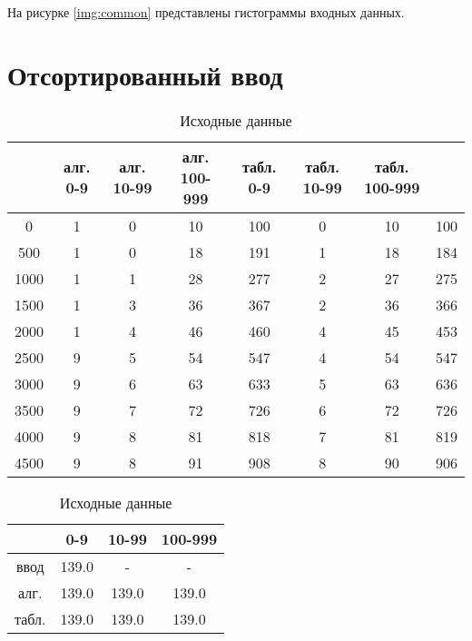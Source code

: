 На рисурке \ref{img:common} представлены гистограммы входных данных.


\section{Отсортированный ввод}

\begin{table}[ht]
	\begin{center}
		\caption{Исходные данные}
		\small
		\label{tbl:data2}
        \begin{tabular}{|c|c|c|c|c|c|c|c|}
        \hline
        {} &  алг. 0-9 &  алг. 10-99 &  алг. 100-999 &  табл. 0-9 &  табл. 10-99 &  табл. 100-999 \\
        \hline
        0    & 1 & 0 & 10 & 100 & 0 & 10 & 100 \\
        500  & 1 & 0 & 18 & 191 & 1 & 18 & 184 \\
        1000 & 1 & 1 & 28 & 277 & 2 & 27 & 275 \\
        1500 & 1 & 3 & 36 & 367 & 2 & 36 & 366 \\
        2000 & 1 & 4 & 46 & 460 & 4 & 45 & 453 \\
        2500 & 9 & 5 & 54 & 547 & 4 & 54 & 547 \\
        3000 & 9 & 6 & 63 & 633 & 5 & 63 & 636 \\
        3500 & 9 & 7 & 72 & 726 & 6 & 72 & 726 \\
        4000 & 9 & 8 & 81 & 818 & 7 & 81 & 819 \\
        4500 & 9 & 8 & 91 & 908 & 8 & 90 & 906 \\
        \hline
        \end{tabular}
	\end{center}
\end{table}

\begin{table}[ht]
	\begin{center}
		\caption{Исходные данные}
		\small
		\label{tbl:ibd2}
        \begin{tabular}{|c|c|c|c|}
        \hline
        {} &    0-9 &  10-99 & 100-999 \\
        \hline
        ввод  &  139.0 &      - &       - \\
        алг.  &  139.0 &  139.0 &   139.0 \\
        табл. &  139.0 &  139.0 &   139.0 \\
        \hline
        \end{tabular}
	\end{center}
\end{table}        

